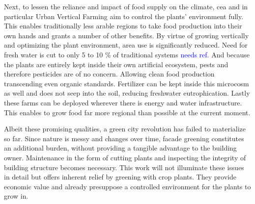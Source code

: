 Next, to lessen the reliance and impact of food supply on the climate, \ac{cea} and in particular Urban Vertical Farming aim to control the plants' environment fully.
This enables traditionally less arable regions to take food production into their own hands and grants a number of other benefits. %
By virtue of growing vertically and optimizing the plant environment, area use is significantly reduced.
Need for fresh water is cut to only 5 to 10 \% of traditional systems \textcolor{Blue}{needs ref}. %
And because the plants are entirely kept inside their own artificial ecosystem, pests and therefore pesticides are of no concern.
Allowing clean food production transcending even organic standards.
Fertilizer can be kept inside this microcosm as well and does not seep into the soil, reducing freshwater eutrophication.
Lastly these farms can be deployed wherever there is energy and water infrastructure.
This enables to grow food far more regional than possible at the current moment.

Albeit these promising qualities, a green city revolution has failed to materialize so far.
Since nature is messy and changes over time, facade greening constitutes an additional burden, without providing a tangible advantage to the building owner.
Maintenance in the form of cutting plants and inspecting the integrity of building structure becomes necessary.
This work will not illuminate these issues in detail but offers inherent relief by greening with crop plants.
They provide economic value and already presuppose a controlled environment for the plants to grow in.

